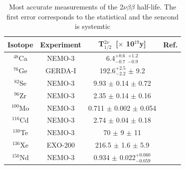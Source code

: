 \documentclass[main.tex]{subfiles}
\begin{document}
\begin{table}[h!]
\centering
\begin{tabular}{cccc}
\toprule
Isotope & Experiment & T$_{\text{1/2}}^{\text{2}\nu}$~[$\times$ 10$^{\text{19}}$y]& Ref. \\
\midrule
$^{\text{48}}$Ca  & NEMO-3  & 6.4$^{+\text{0.6}}_{-\text{0.7}}$ $^{+\text{1.2}}_{-\text{0.9}}$ & \cite{NEMO3:Ca48} \\[0.1cm]
$^{\text{76}}$Ge  & GERDA-I & 192.6$^{+\text{2.5}}_{-\text{2.2}}$ $\pm$ 9.2 & \cite{Gerda2nubb} \\[0.1cm]
$^{\text{82}}$Se  & NEMO-3  & 9.93 $\pm$ 0.14 $\pm$ 0.72 & \cite{ThesisJMott} \\[0.1cm]
$^{\text{96}}$Zr  & NEMO-3  & 2.35 $\pm$ 0.14 $\pm$ 0.16 & \cite{NEMO3:Zr96} \\[0.1cm]
$^{\text{100}}$Mo & NEMO-3  & 0.711 $\pm$ 0.002 $\pm$ 0.054 & \cite{NEMO3:Mo100-pre} \\[0.1cm]
$^{\text{116}}$Cd & NEMO-3  & 2.74 $\pm$ 0.04 $\pm$ 0.18 & \cite{Arnold2016bed} \\[0.1cm]
$^{\text{130}}$Te & NEMO-3  & 70 $\pm$ 9 $\pm$ 11 & \cite{NEMO3:Te130} \\[0.1cm]
$^{\text{136}}$Xe & EXO-200 & 216.5 $\pm$ 1.6 $\pm$ 5.9 & \cite{EXO-200-2nubb} \\[0.1cm]
$^{\text{150}}$Nd & NEMO-3  & 0.934 $\pm$ 0.022$^{+\text{0.060}}_{-\text{0.059}}$  & \cite{NEMO3:Nd150} \\
\bottomrule
\end{tabular}
\caption{Most accurate measurements of the 2$\nu\beta\beta$ half-life. The first error corresponds to the statistical and the sencond is systemtic}
\label{tab:summaryBB2NUmeasurements}
\end{table}
\end{document}
